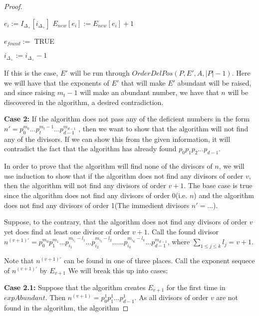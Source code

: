 \documentclass[../paper.tex]{subfiles}
\begin{document}
\begin{proof}
\begin{algorithmic}
		\STATE $e_i := I_{\Delta_{+}}[i_{\Delta_{+}}]$
		\STATE $E_{new}[e_i] := E_{new}[e_i] + 1$

			\STATE $e_{found} :=$ TRUE
		\ENDIF

	\STATE $i_{\Delta_{+}} :=  i_{\Delta_{+}} - 1$

	\ENDIF 

\ENDWHILE

\end{algorithmic}

If this is the case, $E'$ will be run through $OrderDelPos(P, E',
A, |P| - 1)$. Here we will have that the exponents of $E'$ that
will make $E'$ abundant will be raised, and since raising $m_t -1$
will make an abundant number, we have that $n$ will be discovered
in the algorithm, a desired contradiction.


\textbf{Case 2:}
  If the algorithm does not pass any of the deficient numbers in
the form $n' = p_0^{m_0}...p_{t}^{m_t - 1}...p_{d-1}^{m_{d-1}}$ ,
then  we want to show that the algorithm will not find any of the
divisors. If we can show this from the given information, it will
contradict the fact that the algorithm has already found $ p_0 p_1
p_2 ... p_{d-1}$.

In order to prove that the algorithm will find none of the
divisors of $n$, we will use induction to show that if the
algorithm does not find any divisors of order $v$, then the
algorithm will not find any divisors of order $v + 1$. The base
case is true since the algorithm does not find any divisors of
order 0(i.e. $n$) and the algorithm does not find any divisors of
order 1(The immedient divisors $n'= ...$).

Suppose, to the contrary, that the algorithm does not find any
divisors of order $v$ yet does find at least one divisor of order
$v+1$. Call the found divisor $n^{(v+1)'}  = p_0^{m_0} p_1^{m_1} ...
p_{i_1}^{m_{i_1} - l_1} ... p_{i_2}^{m_{i_2} - l_2} ... ...
p_{i_k}^{m_{i_K} - l_k} ... p_{d-1}^{m_{d-1}}$, where $\sum_{1 \leq j
\leq k} l_j = v + 1$.

Note that $n^{(v+1)'}$ can be found in one of three places. Call 
the exponent sequece of $n^{(v+1)'}$ by $E_{v+1}$ 
We will break this up into cases:

\textbf{Case 2.1:} 
  Suppose that the algorithm creates $E_{v+1}$ for the first time in
$expAbundant$. Then $n^{(v+1)} = p_0^1 p_1^1 ... p_{d-1}^1$. As all
divisors of order $v$ are not found in the algorithm, the
algorithm   


\end{proof}
\end{document}
